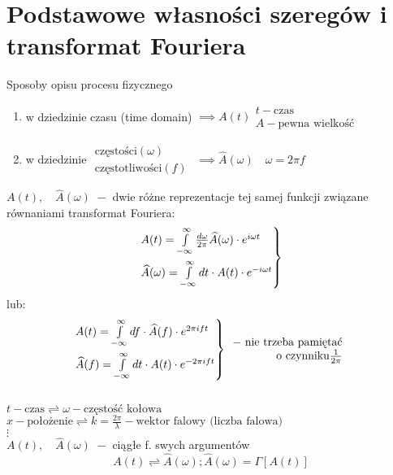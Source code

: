 \section{Podstawowe własności szeregów i transformat Fouriera}
\begin{frame}[allowframebreaks]{Sposoby opisu procesu fizycznego}
	\begin{enumerate}
		\item w dziedzinie czasu (time domain) $
		\implies A(t)
		\begin{array}{l}
		t - \text{czas} \\ A - \text{pewna wielkość}
		\end{array}$
		\item w dziedzinie $
		\begin{array}{l}
		\text{częstości} (\omega) \\ \text{częstotliwości} (f)
		\end{array}$
		$\implies \widehat{A}(\omega) \quad \omega = 2 \pi f$
	\end{enumerate}
	$A(t), \quad \widehat{A}(\omega) \,\, - $ dwie różne reprezentacje tej samej funkcji związane równaniami transformat Fouriera:
	\[
	\begin{rcases*}
		A(t) = \int\limits_{-\infty}^{\infty}\frac{d \omega}{2\pi}\widehat{A}(\omega) \cdot e^{i \omega t} \\
		\widehat{A}(\omega) = \int\limits_{-\infty}^{\infty}dt \cdot A(t) \cdot e^{-i \omega t}
	\end{rcases*}
	\]		
	lub:
	\[
	\begin{rcases*}
		A(t) = \int\limits_{-\infty}^{\infty}df \cdot \widehat{A}(f) \cdot e^{2 \pi ift} \\
		\widehat{A}(f) = \int\limits_{-\infty}^{\infty}dt \cdot A(t) \cdot e^{-2 \pi ift}
		\end{rcases*}
		\begin{array}{r}
		- \,\, \text{nie trzeba pamiętać}\\ \text{o czynniku} \frac{1}{2 \pi}
	\end{array}
	\]
	\\ $t - \text{czas} \rightleftharpoons \omega - \text{częstość kołowa}$
	\\ $x - \text{położenie} \rightleftharpoons k = \frac{2 \pi}{\lambda} - \text{wektor falowy (liczba falowa)}$
	\\ $\vdots$
	\\ $A(t), \quad \widehat{A}(\omega) \,\, - $ ciągłe f. swych argumentów
	\[
		A(t) \rightleftharpoons \widehat{A}(\omega); \widehat{A}(\omega) = \Gamma[A(t)]
	\]
\end{frame}
